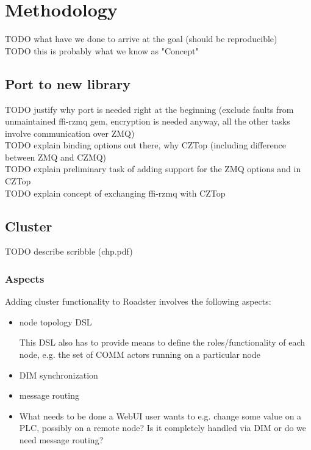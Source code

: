 \chapter{Methodology}
TODO what have we done to arrive at the goal (should be reproducible)\\
TODO this is probably what we know as "Concept"\\



\section{Port to new \zmq library}\label{sec:meth:port}
TODO justify why port is needed right at the beginning (exclude faults from unmaintained ffi-rzmq gem, encryption is needed anyway, all the other tasks involve communication over ZMQ)\\
TODO explain binding options out there, why CZTop (including difference between ZMQ and CZMQ)\\
TODO explain preliminary task of adding support for the ZMQ options  and  in CZTop\\
TODO explain concept of exchanging ffi-rzmq with CZTop\\


\section{Cluster}\label{sec:meth:cluster}
TODO describe scribble (chp.pdf)


\subsection{Aspects}
Adding cluster functionality to Roadster involves the following aspects:
\begin{itemize}
	\item node topology DSL

		This DSL also has to provide means to define the roles/functionality of each node, e.g. the set of COMM actors running on a particular node

	\item DIM synchronization
	\item message routing
	\item What needs to be done a WebUI user wants to e.g. change some value on a PLC, possibly on a remote node? Is it completely handled via DIM or do we need message routing?
\end{itemize}




